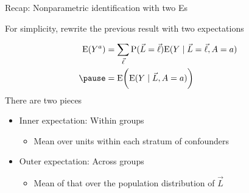 \documentclass{beamer}
\newcommand\E{\text{E}}
\renewcommand\P{\text{P}}
\newcommand\bblue[1]{\textcolor{blue}{\textbf{#1}}}
\begin{document}
\begin{frame}{Recap: Nonparametric identification with two Es}

For simplicity, rewrite the previous result with two expectations \pause

$$\begin{aligned}
\E(Y^a) &= \sum_{\vec\ell}\P(\vec{L} = \vec\ell) \E(Y\mid \vec{L} = \vec\ell, A = a) \\ \pause
&= \E\bigg(\E(Y\mid \vec{L}, A = a)\bigg)
\end{aligned}$$ \pause
There are two pieces \pause
\begin{itemize}
\item Inner expectation: Within groups
\begin{itemize}
\item Mean over units within each stratum of confounders
\end{itemize} \pause
\item Outer expectation: Across groups
\begin{itemize}
\item Mean of that over the population distribution of $\vec{L}$
\end{itemize}
\end{itemize}

\end{frame}

\end{document}
